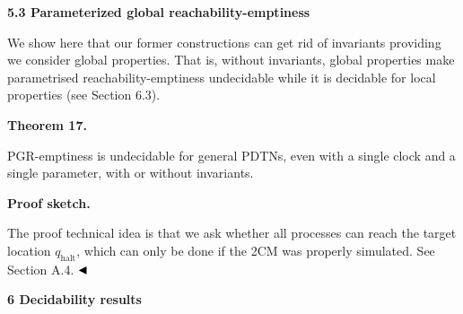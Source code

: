  
 
 
 
\par\medskip\noindent\textbf{5.3 Parameterized global reachability-emptiness}\par
 
 
We show here that our former constructions can get rid of invariants providing we consider global properties. That is, without invariants, global properties make parametrised reachability-emptiness undecidable while it is decidable for local properties (see Section 6.3).\par
 
 
 
\par\medskip\noindent\textbf{Theorem 17.}\par
 
 
PGR-emptiness is undecidable for general PDTNs, even with a single clock and a single parameter, with or without invariants.\par
 
 
 
 
\par\medskip\noindent\textbf{Proof sketch.}\par
 
 
The proof technical idea is that we ask whether all processes can reach the target location $q_{\textrm{halt}}$, which can only be done if the 2CM was properly simulated. See Section A.4. $\hfill\blacktriangleleft$\par
 
 
 
 


 
\par\medskip\noindent\textbf{6 Decidability results}\par
 
